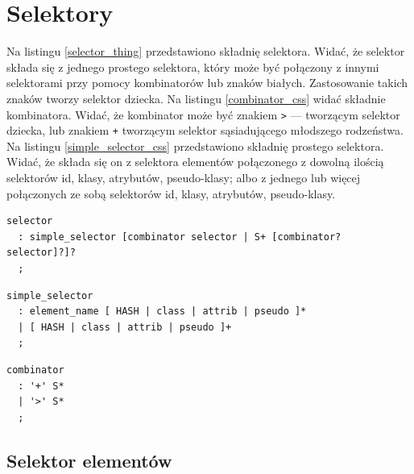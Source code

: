 \documentclass[a4paper,12pt]{book} %
\begin{document}
\section{Selektory}
Na listingu \ref{selector_thing} przedstawiono składnię selektora. Widać, że selektor składa się z jednego prostego selektora, który może być połączony z innymi selektorami przy pomocy kombinatorów lub znaków białych. Zastosowanie takich znaków tworzy selektor dziecka. Na listingu \ref{combinator_css} widać składnie kombinatora. Widać, że kombinator może być znakiem \lstinline|>| --- tworzącym selektor dziecka, lub znakiem \lstinline|+| tworzącym selektor sąsiadującego młodszego rodzeństwa. Na listingu \ref{simple_selector_css} przedstawiono składnię prostego selektora. Widać, że składa się on z selektora elementów połączonego z dowolną ilością selektorów id, klasy, atrybutów, pseudo-klasy; albo z jednego lub więcej połączonych ze sobą selektorów id, klasy, atrybutów, pseudo-klasy.

\begin{lstfloat}[hb]
  \lstset{language=HTML}
  \begin{lstlisting}[frame=single]
selector
  : simple_selector [combinator selector | S+ [combinator? selector]?]?
  ;
\end{lstlisting}
  \caption{Składnia selektora CSS \cite{GrammarofCSS}}\label{selector_thing}
\end{lstfloat}

\begin{lstfloat}[hb]
  \lstset{language=HTML}
  \begin{lstlisting}[frame=single]
simple_selector
  : element_name [ HASH | class | attrib | pseudo ]*
  | [ HASH | class | attrib | pseudo ]+
  ;
\end{lstlisting}
  \caption{Składnia prostego selektora CSS \cite{GrammarofCSS}}\label{simple_selector_css}
\end{lstfloat}

\begin{lstfloat}[hb]
  \lstset{language=HTML}
  \begin{lstlisting}[frame=single]
combinator
  : '+' S*
  | '>' S*
  ;
\end{lstlisting}
  \caption{Składnia kombinatora CSS \cite{GrammarofCSS}}\label{combinator_css}
\end{lstfloat}

\clearpage
\subsection{Selektor elementów}
\end{document}
